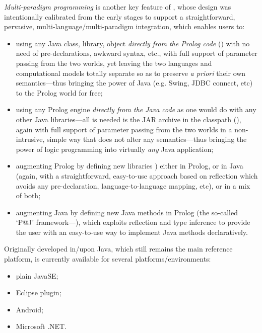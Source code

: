 \textit{Multi-paradigm programming} is another key feature of \tuprolog{}, whose design was intentionally calibrated from the early stages to support a straightforward, pervasive, multi-language/multi-paradigm integration, which enables users to:
\begin{itemize}
  \item using any Java class, library, object \emph{directly from the Prolog code}
  () with no need of pre-declarations, awkward syntax, etc., with full support of parameter passing from the two worlds, yet leaving the two languages and computational models totally separate so as to preserve \emph{a priori} their own semantics---thus bringing the power of Java (e.g. Swing, JDBC connect, etc) to the Prolog world for free;

  \item using any Prolog engine \emph{directly from the Java code} as one would do
  with any other Java libraries---all is needed is the JAR archive in the classpath (), again with full support of parameter passing from the two worlds in a non-intrusive, simple way that does not alter any semantics---thus bringing
  the power of logic programming into virtually \emph{any} Java application;

  \item augmenting Prolog by defining new libraries )
  either in Prolog, or in Java (again, with a straightforward, easy-to-use approach based on reflection which avoids any pre-declaration, language-to-language mapping, etc), or in a mix of both;

  \item augmenting Java by defining new Java methods in Prolog (the so-called `P@J' framework---), which exploits reflection and type inference to provide the user with an easy-to-use way to implement Java methods declaratively.
\end{itemize}

Originally developed in/upon Java, which still remains the main reference platform,
\tuprolog{} is currently available for several platforms/environments:
\begin{itemize}
  \item plain JavaSE;
  \item Eclipse plugin;
  \item Android;
  \item Microsoft .NET.
\end{itemize}


